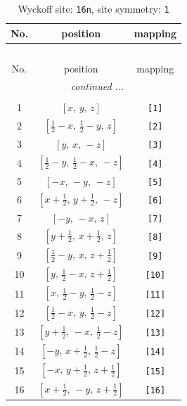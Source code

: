 \documentclass[fleqn,8pt]{jsarticle}
\begin{document}
\begin{longtable}{ccc}
\caption{Wyckoff site: {\tt 16n}, site symmetry: {\tt 1}}
 \\
 \hline \hline
No. & position & mapping \\ \hline \endfirsthead

\multicolumn{2}{l}{\tablename\ \thetable{}} \\
 \hline \hline
No. & position & mapping \\ \hline \endhead

 \hline \hline
\multicolumn{2}{r}{\footnotesize\it continued ...} \\ \endfoot

 \hline \hline
\multicolumn{2}{r}{} \\ \endlastfoot

1 & $\left[ x,\, y,\, z \right]$ & {\tt [1]} \\ \hline
2 & $\left[ \frac{1}{2} - x,\, \frac{1}{2} - y,\, z \right]$ & {\tt [2]} \\ \hline
3 & $\left[ y,\, x,\, - z \right]$ & {\tt [3]} \\ \hline
4 & $\left[ \frac{1}{2} - y,\, \frac{1}{2} - x,\, - z \right]$ & {\tt [4]} \\ \hline
5 & $\left[ - x,\, - y,\, - z \right]$ & {\tt [5]} \\ \hline
6 & $\left[ x + \frac{1}{2},\, y + \frac{1}{2},\, - z \right]$ & {\tt [6]} \\ \hline
7 & $\left[ - y,\, - x,\, z \right]$ & {\tt [7]} \\ \hline
8 & $\left[ y + \frac{1}{2},\, x + \frac{1}{2},\, z \right]$ & {\tt [8]} \\ \hline
9 & $\left[ \frac{1}{2} - y,\, x,\, z + \frac{1}{2} \right]$ & {\tt [9]} \\ \hline
10 & $\left[ y,\, \frac{1}{2} - x,\, z + \frac{1}{2} \right]$ & {\tt [10]} \\ \hline
11 & $\left[ x,\, \frac{1}{2} - y,\, \frac{1}{2} - z \right]$ & {\tt [11]} \\ \hline
12 & $\left[ \frac{1}{2} - x,\, y,\, \frac{1}{2} - z \right]$ & {\tt [12]} \\ \hline
13 & $\left[ y + \frac{1}{2},\, - x,\, \frac{1}{2} - z \right]$ & {\tt [13]} \\ \hline
14 & $\left[ - y,\, x + \frac{1}{2},\, \frac{1}{2} - z \right]$ & {\tt [14]} \\ \hline
15 & $\left[ - x,\, y + \frac{1}{2},\, z + \frac{1}{2} \right]$ & {\tt [15]} \\ \hline
16 & $\left[ x + \frac{1}{2},\, - y,\, z + \frac{1}{2} \right]$ & {\tt [16]} \\
\end{longtable}
\end{document}
